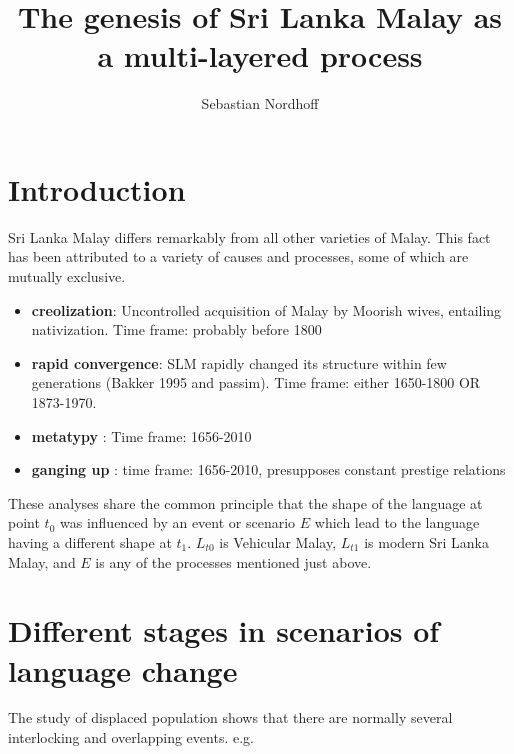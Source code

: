 \documentclass[a4paper,12pt]{article}
\title{The genesis of Sri Lanka Malay as a multi-layered process}
\author{Sebastian Nordhoff}
\begin{document}
\maketitle
  
\section{Introduction}
Sri Lanka Malay differs remarkably from all other varieties of Malay. This fact has been attributed to a variety of causes and processes, some of which are mutually exclusive.
\begin{itemize}
 \item \textbf{creolization}: Uncontrolled acquisition of Malay by Moorish wives, entailing nativization. Time frame: probably before 1800 \citep{Smith2003timing, SmithEtAl2004, SmithEtAl2006cll, Slomanson2006cll}
 \item \textbf{rapid convergence}: SLM rapidly changed its structure within few generations (Bakker 1995 and passim\nocite{Bakker1995}). Time frame: either 1650-1800 OR 1873-1970.
 \item \textbf{metatypy} \citep{Bakker2006}: Time frame: 1656-2010
 \item \textbf{ganging up} \citep{Ansaldo2008genesis,Ansaldo2009}: time frame: 1656-2010, presupposes constant prestige relations
\end{itemize}

These analyses share the common principle that the shape of the language at point $t_0$ was influenced by an event or scenario $E$ which lead to the language having a different shape at $t_1$. $L_{t0}$ is Vehicular Malay, $L_{t1}$ is modern Sri Lanka Malay, and $E$ is any of the processes mentioned just above.


\section{Different stages in scenarios of language change}
The study of displaced population shows that there are normally several interlocking and overlapping events. e.g.
\end{document}
